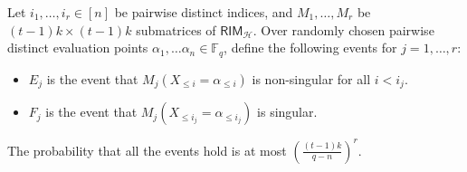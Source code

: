 \documentclass{article}[11pt]
\begin{document}
\begin{lemma}
  Let $i_1,\dots,i_{r}\in[n]$ be pairwise distinct indices, and $M_1,\dots,M_r$ be $(t-1)k\times (t-1)k$ submatrices of $\mathsf{RIM}_\mathcal{H}$. Over randomly chosen pairwise distinct evaluation points $\alpha_1,\dots\alpha_n \in \mathbb{F}_q$, define the following events for $j=1,\dots,r$:
  \begin{itemize}
      \item $E_j$ is the event that $M_j(X_{\le i}=\alpha_{\le i})$ is non-singular for all $i < i_j$.
      \item $F_j$ is the event that $M_j(X_{\le i_j}=\alpha_{\le i_j})$ is singular.
    \end{itemize}
    The probability that all the events hold is at most $(\frac{(t-1)k}{q-n})^{r}$.
    \label{lem:product}
\end{lemma}
\end{document}
